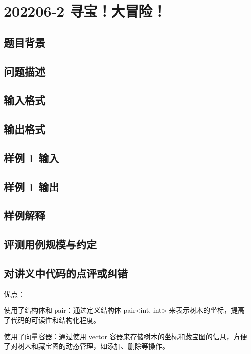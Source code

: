 \section{202206-2 寻宝！大冒险！}

\subsection{题目背景}

\subsection{问题描述}

\subsection{输入格式}

\subsection{输出格式}

\subsection{样例 1 输入}

\subsection{样例 1 输出}

\subsection{样例解释}

\subsection{评测用例规模与约定}

\subsection{对讲义中代码的点评或纠错}
 
优点：

使用了结构体和 pair：通过定义结构体 pair<int, int> 来表示树木的坐标，提高了代码的可读性和结构化程度。

使用了向量容器：通过使用 vector 容器来存储树木的坐标和藏宝图的信息，方便了对树木和藏宝图的动态管理，如添加、删除等操作。

